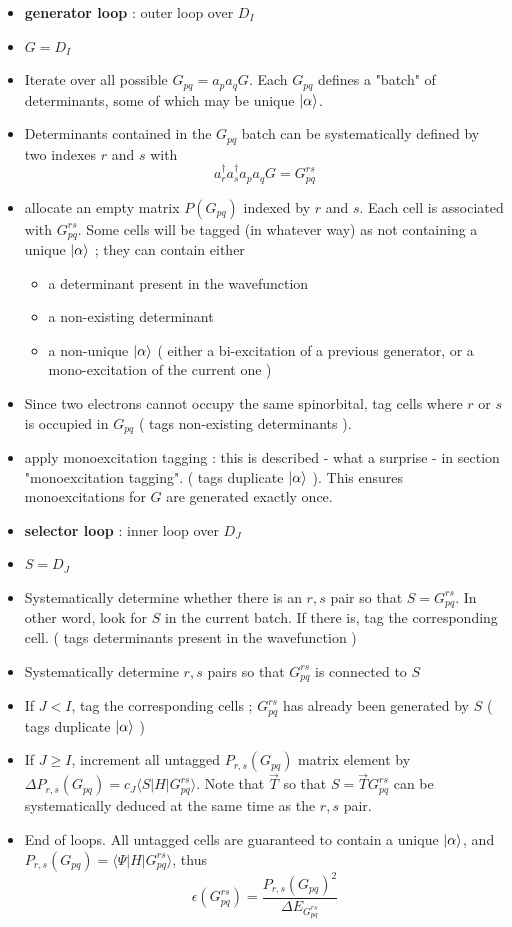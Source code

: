 \begin{itemize}
\item
\textbf{generator loop} : outer loop over $D_I$
\item
$G = D_I$
\item
Iterate over all possible $G_{pq} = a_p a_q G$. Each $G_{pq}$ defines a "batch" of determinants, some of which may be unique $| \alpha \rangle$.
\item
Determinants contained in the $G_{pq}$ batch can be systematically defined by two indexes $r$ and $s$ with
$$a^\dagger_r a^\dagger_s a_p a_q  G = G^{rs}_{pq}$$
\item
allocate an empty matrix $P(G_{pq})$ indexed by $r$ and $s$. Each cell is associated with $G^{rs}_{pq}$. Some cells will be tagged (in whatever way) as not containing a unique $| \alpha \rangle$ ; they can contain either
\begin{itemize}
\item
a determinant present in the wavefunction
\item
a non-existing determinant
\item
a non-unique $| \alpha \rangle$ ( either a bi-excitation of a previous generator, or a mono-excitation of the current one )
\end{itemize}

\item
Since two electrons cannot occupy the same spinorbital, tag cells where $r$ or $s$ is occupied in $G_{pq}$ ( tags non-existing determinants ). 
\item
apply monoexcitation tagging : this is described - what a surprise - in section "monoexcitation tagging". ( tags duplicate $| \alpha \rangle$ ). This ensures monoexcitations for $G$ are generated exactly once.
\item
\textbf{selector loop} : inner loop over $D_J$ 
\item
$S = D_J$
\item
Systematically determine whether there is an $r,s$ pair so that $S=G_{pq}^{rs}$. In other word, look for $S$ in the current batch. If there is, tag the corresponding cell. ( tags determinants present in the wavefunction )
\item
Systematically determine $r,s$ pairs so that $G_{pq}^{rs}$ is connected to $S$
\item
If $J<I$, tag the corresponding cells ; $G_{pq}^{rs}$ has already been generated by $S$ ( tags duplicate $| \alpha \rangle$ )
\item
If $J \geq I$, increment all untagged $P_{r,s}(G_{pq})$ matrix element by $\Delta P_{r,s}(G_{pq}) = c_J\langle S| H|  G^{rs}_{pq} \rangle$. Note that $\overrightarrow{T}$ so that $S=\overrightarrow{T}G^{rs}_{pq}$ can be systematically deduced at the same time as the $r,s$ pair.
\item
End of loops. All untagged cells are guaranteed to contain a unique $| \alpha \rangle$, and $P_{r,s}(G_{pq}) = \langle \Psi |H|G^{rs}_{pq} \rangle$, thus\\
$$\epsilon(G_{pq}^{rs}) = \frac{P_{r,s}(G_{pq})^2}{\Delta E_{G^{rs}_{pq}}}$$
\end{itemize}


